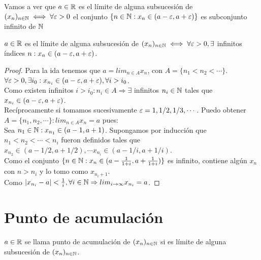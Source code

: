 Vamos a ver que \(a \in \mathbb{R}\) es el límite de alguna subsucesión de \((x_n)_{n \in \mathbb{N}} \iff \forall \varepsilon > 0\) el conjunto \(\{ n \in \mathbb{N} : x_n \in (a - \varepsilon, a + \varepsilon) \}\) es subconjunto infinito de \(\mathbb{N}\)
\begin{theorem}
  \(a \in \mathbb{R}\) es el límite de alguna subsucesión de \((x_n)_{n \in \mathbb{N}} \iff \forall \varepsilon > 0, \exists\) infinitos índices \(n : x_n \in (a-\varepsilon, a+\varepsilon)\).
  \begin{proof}
    Para la ida tenemos que \(a = lim_{n \in A} x_n\), con \(A = \{ n_1 < n_2 < \cdots \}\). \\
    \(\forall \varepsilon > 0, \exists i_0 : x_{n_i} \in (a - \varepsilon, a + \varepsilon), \forall i > i_0\). \\
    Como existen infinitos \(i > i_0 : n_i \in A \Rightarrow \exists\) infinitos \(n_i \in \mathbb{N}\) tales que \(x_{n_i} \in (a - \varepsilon, a + \varepsilon)\). \\

    Recíprocamente si tomamos sucesivamente \(\varepsilon = 1, 1/2, 1/3, \cdots\). Puedo obtener \(A = \{ n_1, n_2, \cdots \} : lim_{n \in A} x_n = a\) pues: \\
    Sea \(n_1 \in \mathbb{N} : x_{n_1} \in (a-1, a+1)\). Supongamos por inducción que \(n_1 < n_2 < \cdots < n_i\) fueron definidos tales que \(x_{n_2} \in (a - 1/2, a + 1/2), \cdots x_{n_i} \in (a - 1/i, a + 1/i)\). \\
    Como el conjunto \(\{ n \in \mathbb{N} : x_n \in (a - \frac{1}{1+i}, a + \frac{1}{1+i}) \}\) es infinito, contiene algún \(x_n\) con \(n > n_i\) y lo tomo como \(x_{n_i + 1}\). \\
    Como \(| x_{n_i} - a | < \frac{1}{i}, \forall i \in \mathbb{N} \Rightarrow lim_{i \to \infty} x_{n_i} = a\).
  \end{proof}
\end{theorem}

\section{Punto de acumulación}

\begin{definition}
  \(a \in \mathbb{R}\) se llama punto de acumulación de \((x_n)_{n \in \mathbb{N}}\) si es límite de alguna subsucesión de \((x_n)_{n \in \mathbb{N}}\).
\end{definition}

